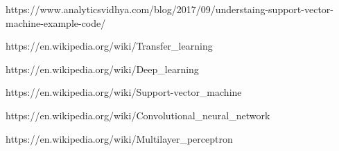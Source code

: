 \begin{thebibliography}{99}
https://www.analyticsvidhya.com/blog/2017/09/understaing-support-vector- machine-example-code/

https://en.wikipedia.org/wiki/Transfer\_learning

https://en.wikipedia.org/wiki/Deep\_learning

https://en.wikipedia.org/wiki/Support-vector\_machine

https://en.wikipedia.org/wiki/Convolutional\_neural\_network

https://en.wikipedia.org/wiki/Multilayer\_perceptron

\end{thebibliography}



\clearpage










%